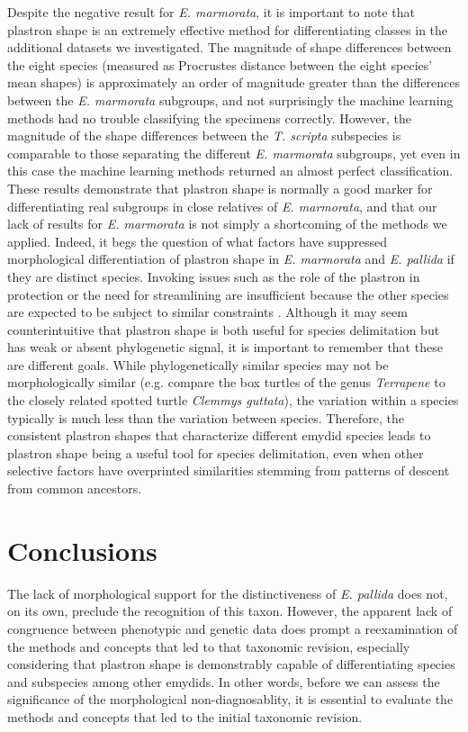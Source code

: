 \documentclass[10pt,letterpaper]{article}
\begin{document}
Despite the negative result for \textit{E. marmorata}, it is important to note that plastron shape is an extremely effective method for differentiating classes in the additional datasets we investigated. The magnitude of shape differences between the eight species (measured as Procrustes distance between the eight species' mean shapes) is approximately an order of magnitude greater than the differences between the \textit{E. marmorata} subgroups, and not surprisingly the machine learning methods had no trouble classifying the specimens correctly. However, the magnitude of the shape differences between the \textit{T. scripta} subspecies is comparable to those separating the different \textit{E. marmorata} subgroups, yet even in this case the machine learning methods returned an almost perfect classification. These results demonstrate that plastron shape is normally a good marker for differentiating real subgroups in close relatives of \textit{E. marmorata}, and that our lack of results for \textit{E. marmorata} is not simply a shortcoming of the methods we applied. Indeed, it begs the question of what factors have suppressed morphological differentiation of plastron shape in \textit{E. marmorata} and \textit{E. pallida} if they are distinct species. Invoking issues such as the role of the plastron in protection or the need for streamlining are insufficient because the other species are expected to be subject to similar constraints \cite{Stayton2011,Polly2016}. Although it may seem counterintuitive that plastron shape is both useful for species delimitation but has weak or absent phylogenetic signal, it is important to remember that these are different goals. While phylogenetically similar species may not be morphologically similar (e.g. compare the box turtles of the genus \textit{Terrapene} to the closely related spotted turtle \textit{Clemmys guttata}), the variation within a species typically is much less than the variation between species. Therefore, the consistent plastron shapes that characterize different emydid species leads to plastron shape being a useful tool for species delimitation, even when other selective factors have overprinted similarities stemming from patterns of descent from common ancestors.

\section*{Conclusions}

The lack of morphological support for the distinctiveness of \textit{E. pallida} does not, on its own, preclude the recognition of this taxon. However, the apparent lack of congruence between phenotypic and genetic data does prompt a reexamination of the methods and concepts that led to that taxonomic revision, especially considering that plastron shape is demonstrably capable of differentiating species and subspecies among other emydids. In other words, before we can assess the significance of the morphological non-diagnosablity, it is essential to evaluate the methods and concepts that led to the initial taxonomic revision. 
\end{document}
